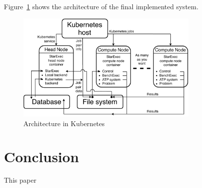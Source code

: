 \documentclass{easychair}
\begin{document}
Figure~\ref{ArchitectureK} shows the architecture of the final implemented system.

\begin{figure}[htb]
\begin{center}
\includegraphics[width=0.8\textwidth]{ArchitectureK}
\caption{Architecture in Kubernetes}
\label{ArchitectureK}
\end{center}
\end{figure}

\section{Conclusion}
\label{Conclusion}

This paper 


\appendix

\newpage
\end{document}
